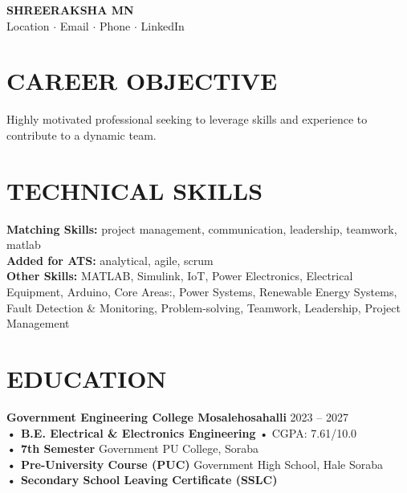 \documentclass[10pt,a4paper]{article}
\begin{document}
\begin{center}
    {\Huge \textbf{SHREERAKSHA MN}} \\
    \vspace{5pt}
    Location $\cdot$ Email $\cdot$ Phone $\cdot$ LinkedIn
\end{center}

\vspace{10pt}

\section*{CAREER OBJECTIVE}
\noindent Highly motivated professional seeking to leverage skills and experience to contribute to a dynamic team.

\section*{TECHNICAL SKILLS}
\textbf{Matching Skills:} project management, communication, leadership, teamwork, matlab \\
\textbf{Added for ATS:} analytical, agile, scrum \\
\textbf{Other Skills:} MATLAB, Simulink, IoT, Power Electronics, Electrical Equipment, Arduino, Core Areas:, Power Systems, Renewable Energy Systems, Fault Detection \& Monitoring, Problem-solving, Teamwork, Leadership, Project Management

\section*{EDUCATION}
\noindent \textbf{Government Engineering College Mosalehosahalli} \hfill 2023 – 2027\\
\noindent \textbf{• B.E. Electrical \& Electronics Engineering} \hfill • CGPA: 7.61/10.0\\
\noindent \textbf{• 7th Semester} \hfill Government PU College, Soraba\\
\noindent \textbf{• Pre-University Course (PUC)} \hfill Government High School, Hale Soraba\\
\noindent \textbf{• Secondary School Leaving Certificate (SSLC)} \hfill \\
\end{document}
